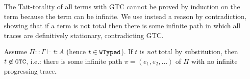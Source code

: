 
The Tait-totality of all terms with GTC cannot be proved by induction on the term because the term can be infinite. We use instead a reason by contradiction, showing that if a term is not total then there is some infinite path in which all traces are definitively stationary, contradicting GTC.




\begin{theorem}
\label{theorem-main-finite-safe-reduction}
  Assume $\Pi::\Gamma\vdash t : A$ (hence $t\in {\tt WTyped}$).
  If $t$ is \emph{not} total by substitution, then $t \not \in {\tt GTC}$, i.e.:
  there is some infinite path $\pi = (e_1, e_2, \ldots)$ of $\Pi$ with no infinite progressing trace. 
\end{theorem}


